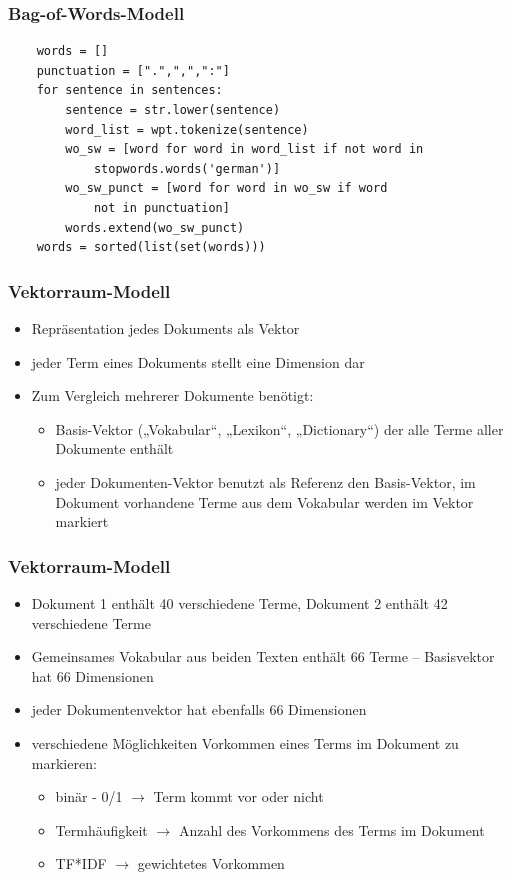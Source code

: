 \begin{frame}[fragile]
    \frametitle{Bag-of-Words-Modell}
     
    \begin{verbatim}
    words = []
    punctuation = [".",",",":"]
    for sentence in sentences:
        sentence = str.lower(sentence)
        word_list = wpt.tokenize(sentence)
        wo_sw = [word for word in word_list if not word in 
            stopwords.words('german')]
        wo_sw_punct = [word for word in wo_sw if word
            not in punctuation]
        words.extend(wo_sw_punct)          
    words = sorted(list(set(words)))
    \end{verbatim}
\end{frame}
    
    
\begin{frame}
    \frametitle{Vektorraum-Modell}
    \begin{itemize}
    \item Repräsentation jedes Dokuments als Vektor
    \item jeder Term eines Dokuments stellt eine Dimension dar 
    \item Zum Vergleich mehrerer Dokumente benötigt:
    \begin{itemize}
    \item Basis-Vektor („Vokabular“, „Lexikon“, „Dictionary“) der alle Terme aller Dokumente enthält
    \item jeder Dokumenten-Vektor benutzt als Referenz den Basis-Vektor, im Dokument vorhandene Terme aus dem 
    Vokabular werden im Vektor markiert
    \end{itemize}
    \end{itemize}
\end{frame}
    
    
\begin{frame}
    \frametitle{Vektorraum-Modell}
    \begin{itemize}
    \item Dokument 1 enthält 40 verschiedene Terme, Dokument 2 enthält 42 verschiedene Terme
    \item Gemeinsames Vokabular aus beiden Texten enthält 66 Terme -- Basisvektor hat 66 Dimensionen
    \item jeder Dokumentenvektor hat ebenfalls 66 Dimensionen
    \item verschiedene Möglichkeiten Vorkommen eines Terms im Dokument zu markieren:
    \begin{itemize}
    \item binär - 0/1  $\rightarrow$ Term kommt vor oder nicht
    \item Termhäufigkeit  $\rightarrow$ Anzahl des Vorkommens des Terms im Dokument
    \item TF*IDF  $\rightarrow$ gewichtetes Vorkommen
    \end{itemize}
    \end{itemize}
\end{frame}
    
